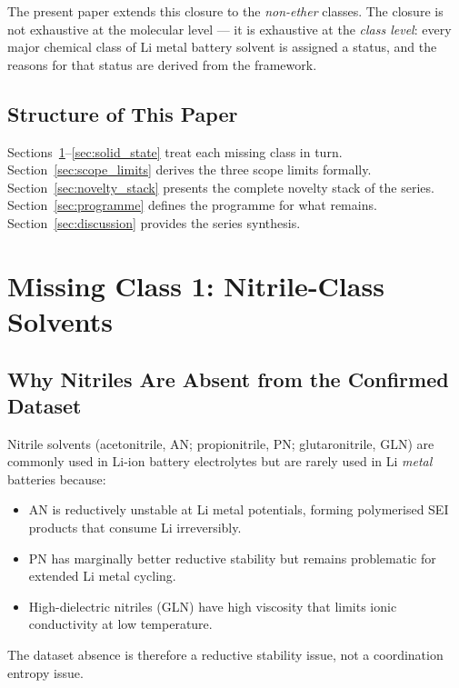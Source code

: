 \documentclass[11pt]{article}
\theoremstyle{plain}
\theoremstyle{definition}
\theoremstyle{remark}
\begin{document}
The present paper extends this closure to the \emph{non-ether}
classes.  The closure is not exhaustive at the molecular level
--- it is exhaustive at the \emph{class level}: every major
chemical class of Li metal battery solvent is assigned a status,
and the reasons for that status are derived from the framework.

\subsection{Structure of This Paper}

Sections~\ref{sec:nitrile}--\ref{sec:solid_state} treat each
missing class in turn.  Section~\ref{sec:scope_limits} derives
the three scope limits formally.  Section~\ref{sec:novelty_stack}
presents the complete novelty stack of the series.
Section~\ref{sec:programme} defines the programme for what
remains.  Section~\ref{sec:discussion} provides the series
synthesis.

\section{Missing Class 1: Nitrile-Class Solvents}
\label{sec:nitrile}

\subsection{Why Nitriles Are Absent from the Confirmed Dataset}

Nitrile solvents (acetonitrile, AN; propionitrile, PN;
glutaronitrile, GLN) are commonly used in Li-ion battery
electrolytes but are rarely used in Li \emph{metal} batteries
because:
\begin{itemize}[leftmargin=2em]
  \item AN is reductively unstable at Li metal potentials,
        forming polymerised SEI products that consume Li
        irreversibly.
  \item PN has marginally better reductive stability but remains
        problematic for extended Li metal cycling.
  \item High-dielectric nitriles (GLN) have high viscosity that
        limits ionic conductivity at low temperature.
\end{itemize}

The dataset absence is therefore a reductive stability issue,
not a coordination entropy issue.
\end{document}

